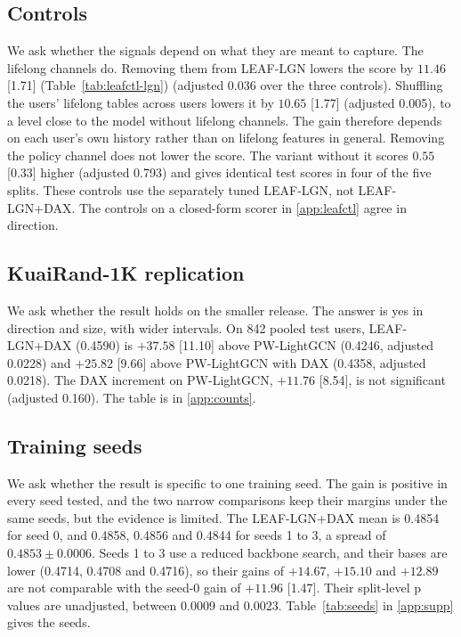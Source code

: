 

\subsection{Controls}
\label{sec:res-controls}

We ask whether the signals depend on what they are meant to capture. The lifelong channels do. Removing them from LEAF-LGN lowers the score by $11.46$ [1.71] (Table~\ref{tab:leafctl-lgn})
(adjusted 0.036 over the three controls). Shuffling the users' lifelong tables across users lowers it by $10.65$ [1.77] (adjusted 0.005), to a level
close to the model without lifelong channels. The gain therefore depends on each user's own history rather than on lifelong features in general.
Removing the policy channel does not lower the score. The variant without it scores $0.55$ [0.33] higher (adjusted 0.793) and gives identical test scores in four of the five splits. These controls use the separately tuned LEAF-LGN, not LEAF-LGN+DAX. The controls on a closed-form scorer in \ref{app:leafctl} agree
in direction.



\subsection{KuaiRand-1K replication}
\label{sec:res-1k}

We ask whether the result holds on the smaller release. The answer is yes in direction and size, with wider intervals. On 842 pooled test users,
LEAF-LGN+DAX (0.4590) is $+37.58$ [11.10] above PW-LightGCN (0.4246, adjusted 0.0228) and $+25.82$ [9.66] above PW-LightGCN with DAX (0.4358, adjusted
0.0218). The DAX increment on PW-LightGCN, $+11.76$ [8.54], is not significant (adjusted 0.160). The table is in \ref{app:counts}.

\subsection{Training seeds}
\label{sec:res-seeds}

We ask whether the result is specific to one training seed. The gain is positive in every seed tested, and the two narrow comparisons keep their margins under the same seeds, but the evidence is limited. The LEAF-LGN+DAX mean is
0.4854 for seed 0, and 0.4858, 0.4856 and 0.4844 for seeds 1 to 3, a spread of $0.4853\pm0.0006$. Seeds 1 to 3 use a reduced backbone search, and their
bases are lower (0.4714, 0.4708 and 0.4716), so their gains of $+14.67$, $+15.10$ and $+12.89$ are not comparable with the seed-0 gain of $+11.96$ [1.47].
Their split-level p values are unadjusted, between 0.0009 and 0.0023. Table~\ref{tab:seeds} in \ref{app:supp} gives the seeds.

